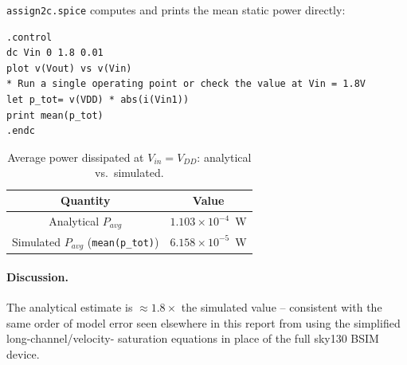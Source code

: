 \texttt{assign2c.spice} computes and prints the mean static power directly:

\begin{verbatim}
.control
dc Vin 0 1.8 0.01
plot v(Vout) vs v(Vin)
* Run a single operating point or check the value at Vin = 1.8V
let p_tot= v(VDD) * abs(i(Vin1))
print mean(p_tot)
.endc
\end{verbatim}

\begin{table}[h]
  \centering
  \begin{tabular}{|c|c|}
    \hline
    Quantity & Value \\
    \hline
    Analytical $P_{avg}$ & $1.103\times10^{-4}$~W \\
    Simulated $P_{avg}$ (\texttt{mean(p\_tot)}) & $6.158\times10^{-5}$~W \\
    \hline
  \end{tabular}
  \caption{Average power dissipated at $V_{in}=V_{DD}$: analytical vs.\
  simulated.}
  \label{tab:2c-power}
\end{table}

\paragraph{Discussion.} The analytical estimate is $\approx1.8\times$ the
simulated value -- consistent with the same order of model error seen
elsewhere in this report from using the simplified long-channel/velocity-
saturation equations in place of the full sky130 BSIM device.

